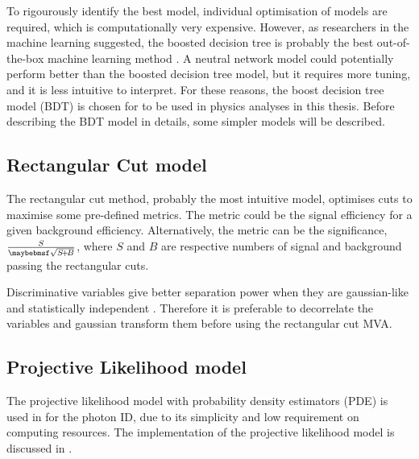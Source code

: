 To rigourously identify the best model, individual optimisation of models are required, which is computationally very expensive. However, as researchers in the machine learning suggested, the boosted decision tree is probably the best out-of-the-box machine learning method  \cite{hastie2009elements}. A neutral network model could potentially perform better than the boosted decision tree model, but it requires more tuning, and it is less intuitive to interpret. For these reasons, the boost decision tree model (BDT) is chosen for to be used in  physics analyses in this thesis. Before describing the BDT model in details, some simpler models will be described.

\subsection{Rectangular Cut model}

The rectangular cut method, probably the most intuitive model, optimises cuts to maximise some pre-defined metrics. The metric could be the signal efficiency for a given background efficiency. Alternatively, the metric can be the significance, $\frac{S}{\rootOf{S\!+\!B}}$, where $S$ and $B$ are respective numbers of  signal and background  passing the rectangular cuts.

Discriminative variables give better separation power when they are gaussian-like and statistically independent \cite{hastie2009elements}. Therefore it is preferable to decorrelate  the variables and gaussian transform them before using the rectangular cut MVA.


\subsection{Projective Likelihood model}
\label{sec:pandoraLikelihood}

The projective likelihood model with probability density estimators (PDE) is used in \pandora for the photon ID,  due to its simplicity and low requirement on computing resources. The \pandora implementation of the projective likelihood model is discussed  in .

